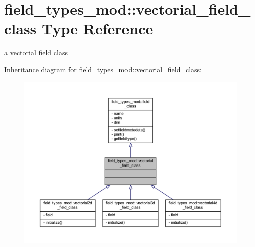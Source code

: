 \hypertarget{structfield__types__mod_1_1vectorial__field__class}{}\section{field\+\_\+types\+\_\+mod\+:\+:vectorial\+\_\+field\+\_\+class Type Reference}
\label{structfield__types__mod_1_1vectorial__field__class}


a vectorial field class  




Inheritance diagram for field\+\_\+types\+\_\+mod\+:\+:vectorial\+\_\+field\+\_\+class\+:
\nopagebreak
\begin{figure}[H]
\begin{center}
\leavevmode
\includegraphics[width=350pt]{structfield__types__mod_1_1vectorial__field__class__inherit__graph}
\end{center}
\end{figure}


